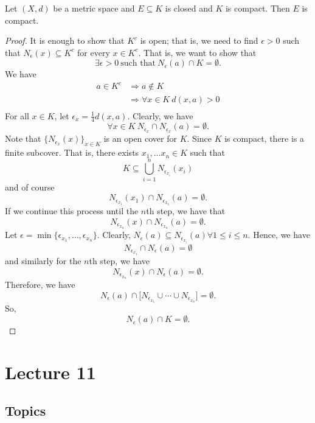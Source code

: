 \documentclass[a4paper]{report}
\begin{document}
\begin{theorem}
Let \( (X,d) \) be a metric space and \( E \subseteq K   \) is closed and \( K  \) is compact. Then \(  E  \) is compact.
\end{theorem}
\begin{proof}
It is enough to show that \( K^{c} \) is open; that is, we need to find \( \epsilon > 0 \) such that \( {N}_{\epsilon}(x) \subseteq K^{c} \) for every \( x \in K^{c} \). That is, we want to show that   
\[ \exists \epsilon > 0 \ \text{such that} \ {N}_{\epsilon}(a) \cap K = \emptyset.   \]
We have 
\begin{align*}
    a \in K^{c} &\Longrightarrow a \notin K  \\
                &\Longrightarrow \forall x \in K \ d(x,a) > 0 \\
\end{align*}
For all \( x \in K  \), let \( {\epsilon}_{x} = \frac{ 1 }{ 4 }  d(x,a) \). Clearly, we have 
\[ \forall x \in K \ {N}_{{\epsilon}_{x}} \cap {N}_{{\epsilon}_{x}}(a) = \emptyset.  \]
Note that \( \{ {N}_{{\epsilon}_{x}}(x) \}_{x \in K} \) is an open cover for \( K   \). Since \(  K  \) is compact, there is a finite subcover. That is, there exists \( {x}_{1}, \dots {x}_{n} \in  K  \) such that 
\[  K \subseteq  \bigcup_{ i =1  }^{ n }  {N}_{{\epsilon}_{{x}_{i}}}({x}_{i}) \]
and of course 
\[  {N}_{{\epsilon}_{{x}_{1}}} ({x}_{1}) \cap {N}_{{\epsilon}_{{x}_{1}}}(a) = \emptyset. \]
If we continue this process until the \( n \)th step, we have that 
\[  {N}_{{\epsilon}_{{x}_{n}}}(x) \cap {N}_{{\epsilon}_{{x}_{n}}}(a) = \emptyset. \]
Let \( \epsilon = \min \{ {\epsilon}_{{x}_{1}}, \dots, {\epsilon}_{{x}_{n}}  \}.   \)
Clearly, \( {N}_{\epsilon}(a) \subseteq  {N}_{{\epsilon}_{{x}_{i}}} (a) \forall 1 \leq i \leq n  \). Hence, we have 
\[  {N}_{{\epsilon}_{{x}_{1}}} \cap {N}_{\epsilon}(a) = \emptyset \]
and similarly for the \( n \)th step, we have 
\[  {N}_{{\epsilon}_{{x}_{n}}}(x) \cap {N}_{\epsilon}(a) = \emptyset. \]
Therefore, we have 
\[  {N}_{\epsilon}(a) \cap \Big[ {N}_{{\epsilon}_{{x}_{1}}} \cup \cdots \cup {N}_{{\epsilon}_{{x}_{n}}} \Big] = \emptyset. \]
So, 
\[  {N}_{\epsilon}(a) \cap K = \emptyset. \]

\end{proof}

\section{Lecture 11}


\subsection{Topics}
\end{document}

